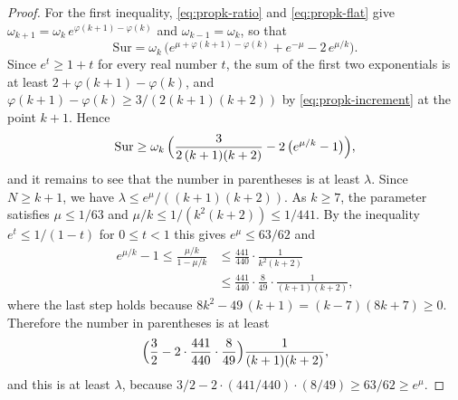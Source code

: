 \documentclass{amsart}
\theoremstyle{definition}
\theoremstyle{remark}
\numberwithin{equation}{section}
\begin{document}
\begin{proof}
For the first inequality, \eqref{eq:propk-ratio} and \eqref{eq:propk-flat}
give $\omega_{k+1}=\omega_k\,e^{\varphi(k+1)-\varphi(k)}$ and
$\omega_{k-1}=\omega_k$, so that
\[
\mathrm{Sur}=\omega_k\,\bigl(e^{\mu+\varphi(k+1)-\varphi(k)}+e^{-\mu}
-2\,e^{\mu/k}\bigr).
\]
Since $e^{t}\ge1+t$ for every real number $t$, the sum of the first two
exponentials is at least $2+\varphi(k+1)-\varphi(k)$, and
$\varphi(k+1)-\varphi(k)\ge3/(2(k+1)(k+2))$ by \eqref{eq:propk-increment}
at the point $k+1$. Hence
\[
\mathrm{Sur}\ge\omega_k\,\Bigl(\frac{3}{2\,(k+1)(k+2)}
-2\,\bigl(e^{\mu/k}-1\bigr)\Bigr),
\]
and it remains to see that the number in parentheses is at least
$\lambda$. Since $N\ge k+1$, we have $\lambda\le e^{\mu}/((k+1)(k+2))$. As
$k\ge7$, the parameter satisfies $\mu\le1/63$ and
$\mu/k\le1/(k^2(k+2))\le1/441$. By the inequality $e^{t}\le1/(1-t)$ for
$0\le t<1$ this gives $e^{\mu}\le63/62$ and
\begin{align*}
e^{\mu/k}-1\le\frac{\mu/k}{1-\mu/k}
&\le\frac{441}{440}\cdot\frac{1}{k^2(k+2)}\\
&\le\frac{441}{440}\cdot\frac{8}{49}\cdot\frac{1}{(k+1)(k+2)} ,
\end{align*}
where the last step holds because $8k^2-49\,(k+1)=(k-7)(8k+7)\ge0$.
Therefore the number in parentheses is at least
\[
\Bigl(\frac32-2\cdot\frac{441}{440}\cdot\frac{8}{49}\Bigr)
\frac{1}{(k+1)(k+2)} ,
\]
and this is at least $\lambda$, because
$3/2-2\cdot(441/440)\cdot(8/49)\ge63/62\ge e^{\mu}$.


\end{proof}
\end{document}
